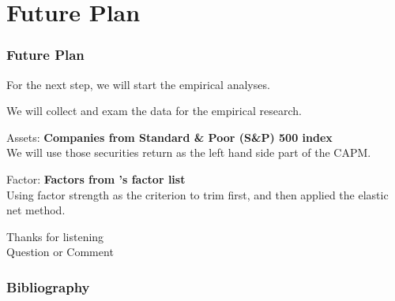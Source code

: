 \documentclass[12pt]{beamer}
\begin{document}


\section{Future Plan}


\begin{frame}
\frametitle{Future Plan}
For the next step, we will start the empirical analyses. 

We will collect and exam the data for the empirical research. 

Assets: {\bf Companies from Standard \& Poor (S\&P) 500 index}\\
We will use those securities return as the left hand side part of the CAPM.

Factor: {\bf Factors from 's factor list}\\
Using factor strength as the criterion to trim first, and then applied the elastic net method.

\end{frame}
\begin{frame}
	\centering	
\huge{ Thanks for listening\\}
\huge{ Question or Comment}
\end{frame}


\begin{frame}[allowframebreaks]
	\frametitle{Bibliography}
	
	
\end{frame}
\end{document}
